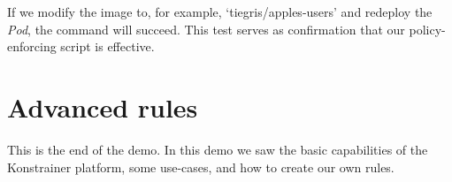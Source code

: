 If we modify the image to, for example, `tiegris/apples-users' and redeploy the \emph{Pod}, the command will succeed. This test serves as confirmation that our policy-enforcing script is effective.

\section{Advanced rules}





This is the end of the demo. In this demo we saw the basic capabilities of the Konstrainer platform, some use-cases, and how to create our own rules.

